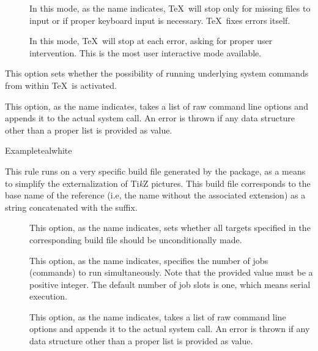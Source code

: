 \begin{description}
\begin{description}
\begin{description}
\item[] In this mode, as the name indicates, \TeX\ will stop only for missing files to input or if proper keyboard input is necessary. \TeX\ fixes errors itself.

\item[] In this mode, \TeX\ will stop at each error, asking for proper user intervention. This is the most user interactive mode available.
\end{description}

\item[\rpsbox{shell}] This option sets whether the possibility of running underlying system commands from within \TeX\ is activated.

\item[\abox{options}] This option, as the name indicates, takes a list of raw command line options and appends it to the actual system call. An error is thrown if any data structure other than a proper list is provided as value.
\end{description}

\begin{codebox}{Example}{teal}{\icnote}{white}
\end{codebox}

\item[\rulebox{tikzmake}{Robbie Smith, Paulo Cereda}] This rule runs  on a very specific build file generated by the  package, as a means to simplify the externalization of Ti{\itshape k}Z pictures. This build file corresponds to the base name of the  reference (i.e, the name without the associated extension) as a string concatenated with the  suffix.

\begin{description}
\item[] This option, as the name indicates, sets whether all targets specified in the corresponding build file should be unconditionally made.

\item[] This option, as the name indicates, specifies the number of jobs (commands) to run simultaneously. Note that the provided value must be a positive integer. The default number of job slots is one, which means serial execution.

\item[] This option, as the name indicates, takes a list of raw command line options and appends it to the actual system call. An error is thrown if any data structure other than a proper list is provided as value.
\end{description}


\end{description}
